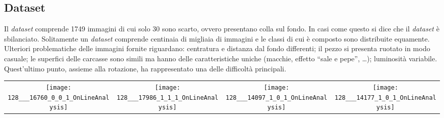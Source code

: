 \documentclass[a0,portrait]{a0poster}
\begin{document}
\begin{multicols}{2}
\section*{Dataset}
Il \textit{dataset} comprende 1749 immagini di cui solo 30 sono scarto, ovvero presentano colla sul fondo.
In casi come questo si dice che il \textit{dataset} è sbilanciato.
Solitamente un \textit{dataset} comprende centinaia di migliaia di immagini e le classi di cui è composto sono distribuite equamente.
Ulteriori problematiche delle immagini fornite riguardano:
centratura e distanza dal fondo differenti;
il pezzo si presenta ruotato in modo casuale;
le superfici delle carcasse sono simili ma hanno delle caratteristiche uniche (macchie, effetto ``sale e pepe'', \dots);
luminosità variabile.
Quest'ultimo punto, assieme alla rotazione, ha rappresentato una delle difficoltà principali.
\\
\begin{center}
    \begin{tabular}{cccc} \label{griglia_dataset}
      \texttt{[image: 128\_\_\_16760\_0\_0\_1\_OnLineAnalysis]} &
      \texttt{[image: 128\_\_\_17986\_1\_1\_1\_OnLineAnalysis]} &
      \texttt{[image: 128\_\_\_14097\_1\_0\_1\_OnLineAnalysis]} &
      \texttt{[image: 128\_\_\_14177\_1\_0\_1\_OnLineAnalysis]}
    \end{tabular}
\end{center}
  



\end{multicols}
\end{document}
